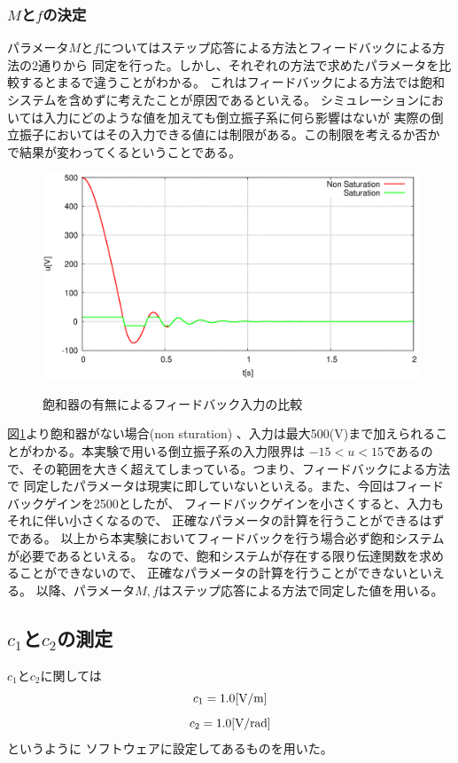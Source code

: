 	\subsubsection{$M$と$f$の決定}
	パラメータ$M$と$f$についてはステップ応答による方法とフィードバックによる方法の2通りから
	同定を行った。しかし、それぞれの方法で求めたパラメータを比較するとまるで違うことがわかる。
	これはフィードバックによる方法では飽和システムを含めずに考えたことが原因であるといえる。
	シミュレーションにおいては入力にどのような値を加えても倒立振子系に何ら影響はないが
	実際の倒立振子においてはその入力できる値には制限がある。この制限を考えるか否か
	で結果が変わってくるということである。
	\begin{figure}[H]
		\centering
		\includegraphics[width=0.8\linewidth]{gazo/feedback_input.eps}\\
		\caption{飽和器の有無によるフィードバック入力の比較}
		\label{image:feedback_saturation}
	\end{figure}
	図\ref{image:feedback_saturation}より飽和器がない場合(non sturation)
	、入力は最大500(V)まで加えられることがわかる。本実験で用いる倒立振子系の入力限界は
	$-15<u<15$であるので、その範囲を大きく超えてしまっている。つまり、フィードバックによる方法で
	同定したパラメータは現実に即していないといえる。また、今回はフィードバックゲインを2500としたが、
	フィードバックゲインを小さくすると、入力もそれに伴い小さくなるので、
	正確なパラメータの計算を行うことができるはずである。
	以上から本実験においてフィードバックを行う場合必ず飽和システムが必要であるといえる。
	なので、飽和システムが存在する限り伝達関数を求めることができないので、
	正確なパラメータの計算を行うことができないといえる。
	以降、パラメータ$M,f$はステップ応答による方法で同定した値を用いる。
	
\subsection{$c_1$と$c_2$の測定}
	$c_1$と$c_2$に関しては
	\[
		c_1 = 1.0 [\rm{V/m}]
	\]
	\[
		c_2 = 1.0[\rm{V/rad}]
	\]
	というように
	ソフトウェアに設定してあるものを用いた。
